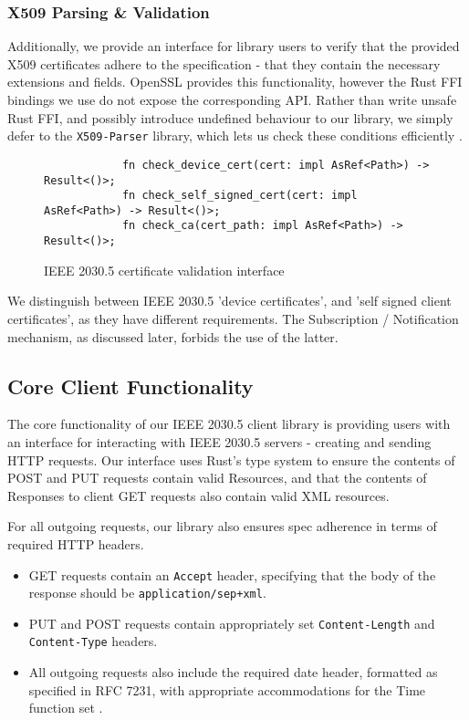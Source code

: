\subsubsection{X509 Parsing \& Validation}
Additionally, we provide an interface for library users to verify that the provided X509 certificates adhere to the specification - that they contain the necessary extensions and fields. OpenSSL provides this functionality, however the Rust FFI bindings we use do not expose the corresponding API. Rather than write unsafe Rust FFI, and possibly introduce undefined behaviour to our library, we simply defer to the \texttt{X509-Parser} library, which lets us check these conditions efficiently \cite{x509parser}.

\begin{figure}[h]
    \begin{center}
        \begin{lstlisting}
            fn check_device_cert(cert: impl AsRef<Path>) -> Result<()>;
            fn check_self_signed_cert(cert: impl AsRef<Path>) -> Result<()>;
            fn check_ca(cert_path: impl AsRef<Path>) -> Result<()>;
        \end{lstlisting}
        \label{fig:certvalidinterface}
        \vspace{-10pt}
        \caption{IEEE 2030.5 certificate validation interface}
    \end{center}
\end{figure}

We distinguish between IEEE 2030.5 'device certificates', and 'self signed client certificates', as they have different requirements. The Subscription / Notification mechanism, as discussed later, forbids the use of the latter.

\subsection{Core Client Functionality}
The core functionality of our IEEE 2030.5 client library is providing users with an interface for interacting with IEEE 2030.5 servers - creating and sending HTTP requests.
Our interface uses Rust's type system to ensure the contents of POST and PUT requests contain valid Resources, and that the contents of Responses to client GET requests also contain valid XML resources.

For all outgoing requests, our library also ensures spec adherence in terms of required HTTP headers. 

\begin{itemize}
    \item GET requests contain an \texttt{Accept} header, specifying that the body of the response should be \texttt{application/sep+xml}.
    \item PUT and POST requests contain appropriately set \texttt{Content-Length} and \texttt{Content-Type} headers.
    \item All outgoing requests also include the required date header, formatted as specified in RFC 7231, with appropriate accommodations for the Time function set  \cite{rfc7231}.
\end{itemize}



